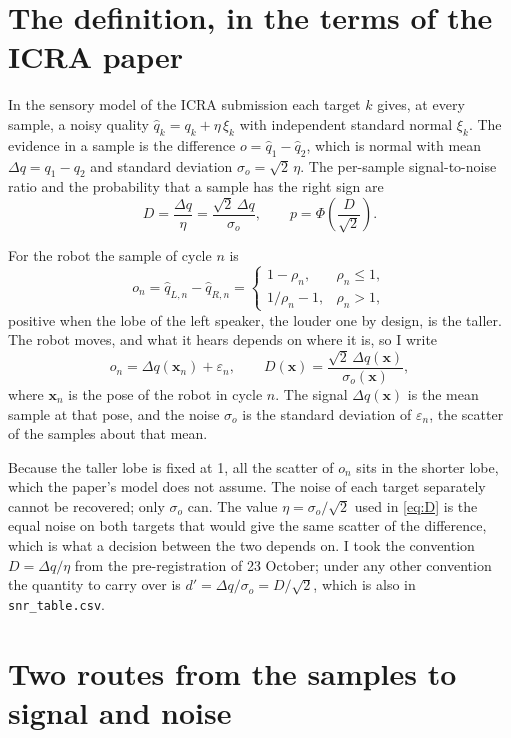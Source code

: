 \documentclass[11pt,a4paper]{article}
\newcommand{\qL}{\hat q_{L,n}}
\newcommand{\qR}{\hat q_{R,n}}
\newcommand{\dq}{\Delta q}
\newcommand{\so}{\sigma_o}
\newcommand{\code}[1]{\texttt{#1}}
\begin{document}
\section{The definition, in the terms of the ICRA paper}

In the sensory model of the ICRA submission each target $k$ gives, at every sample, a noisy quality
$\hat q_k=q_k+\eta\,\xi_k$ with independent standard normal $\xi_k$. The evidence in a sample is the difference
$o=\hat q_1-\hat q_2$, which is normal with mean $\dq=q_1-q_2$ and standard deviation $\so=\sqrt2\,\eta$. The
per-sample signal-to-noise ratio and the probability that a sample has the right sign are
\begin{equation}
D=\frac{\dq}{\eta}=\frac{\sqrt2\,\dq}{\so},\qquad p=\Phi\!\left(\frac{D}{\sqrt2}\right). \label{eq:D}
\end{equation}

For the robot the sample of cycle $n$ is
\begin{equation}
o_n=\qL-\qR=\begin{cases}1-\rho_n, & \rho_n\le 1,\\[2pt] 1/\rho_n-1, & \rho_n>1,\end{cases} \label{eq:o}
\end{equation}
positive when the lobe of the left speaker, the louder one by design, is the taller. The robot moves, and what it
hears depends on where it is, so I write
\begin{equation}
o_n=\dq(\bm{x}_n)+\varepsilon_n ,\qquad D(\bm{x})=\frac{\sqrt2\,\dq(\bm{x})}{\so(\bm{x})}, \label{eq:model}
\end{equation}
where $\bm{x}_n$ is the pose of the robot in cycle $n$. The signal $\dq(\bm{x})$ is the mean sample at that pose,
and the noise $\so$ is the standard deviation of $\varepsilon_n$, the scatter of the samples about that mean.

Because the taller lobe is fixed at 1, all the scatter of $o_n$ sits in the shorter lobe, which the paper's model
does not assume. The noise of each target separately cannot be recovered; only $\so$ can. The value
$\eta=\so/\sqrt2$ used in \eqref{eq:D} is the equal noise on both targets that would give the same scatter of the
difference, which is what a decision between the two depends on. I took the convention $D=\dq/\eta$ from the
pre-registration of 23 October; under any other convention the quantity to carry over is
$d'=\dq/\so=D/\sqrt2$, which is also in \code{snr\_table.csv}.

\section{Two routes from the samples to signal and noise}
\end{document}
